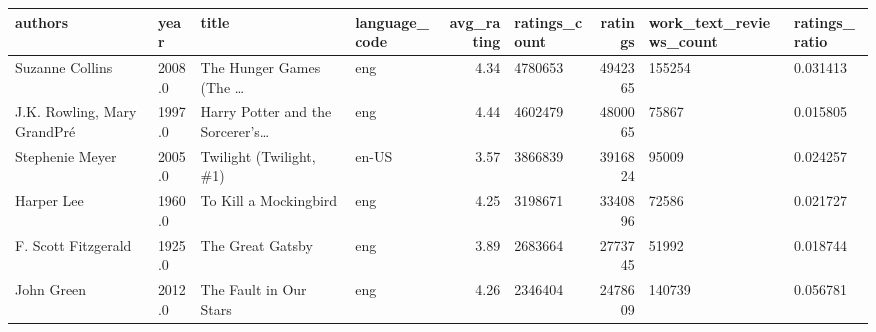 \documentclass[11pt]{article}
\begin{document}
%    






\begin{table}
\begin{tabular}{lHlHrHrHZ}
\toprule
                     authors &  year &                                              title & language\_code &  avg\_rating &  ratings\_count &  ratings &  work\_text\_reviews\_count &  ratings\_ratio \\
\midrule
             Suzanne Collins &                     2008.0 &            The Hunger Games (The \ldots &           eng &            4.34 &        4780653 &             4942365 &                   155254 &       0.031413 \\
 J.K. Rowling, Mary GrandPr\'e &                     1997.0 &  Harry Potter and the Sorcerer's\ldots &           eng &            4.44 &        4602479 &             4800065 &                    75867 &       0.015805 \\
             Stephenie Meyer &                     2005.0 &                            Twilight (Twilight, \#1) &         en-US &            3.57 &        3866839 &             3916824 &                    95009 &       0.024257 \\
                  Harper Lee &                     1960.0 &                              To Kill a Mockingbird &           eng &            4.25 &        3198671 &             3340896 &                    72586 &       0.021727 \\
         F. Scott Fitzgerald &                     1925.0 &                                   The Great Gatsby &           eng &            3.89 &        2683664 &             2773745 &                    51992 &       0.018744 \\
                  John Green &                     2012.0 &                             The Fault in Our Stars &           eng &            4.26 &        2346404 &             2478609 &                   140739 &       0.056781 \\

\end{tabular}
\end{table}
\end{document}
